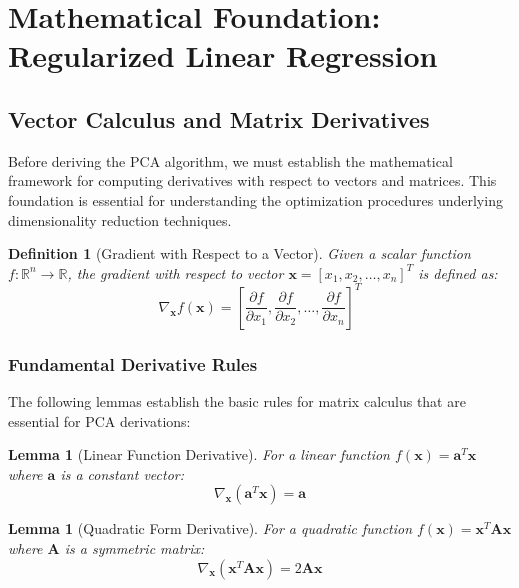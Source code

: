 \documentclass[12pt]{article}
\renewcommand{\vec}[1]{\mathbf{#1}}
\newtheorem{lemma}[theorem]{Lemma}
\newtheorem{definition}[theorem]{Definition}
\begin{document}
\newpage

\section{Mathematical Foundation: Regularized Linear Regression}


\subsection{Vector Calculus and Matrix Derivatives}

Before deriving the PCA algorithm, we must establish the mathematical framework for computing derivatives with respect to vectors and matrices. This foundation is essential for understanding the optimization procedures underlying dimensionality reduction techniques.

\begin{definition}[Gradient with Respect to a Vector]
    Given a scalar function $f: \mathbb{R}^n \rightarrow \mathbb{R}$, the gradient with respect to vector $\vec{x} = [x_1, x_2, \ldots, x_n]^T$ is defined as:
    \begin{equation}
        \nabla_{\vec{x}} f(\vec{x}) = \left[\frac{\partial f}{\partial x_1}, \frac{\partial f}{\partial x_2}, \ldots, \frac{\partial f}{\partial x_n}\right]^T
    \end{equation}
\end{definition}

\subsubsection{Fundamental Derivative Rules}

The following lemmas establish the basic rules for matrix calculus that are essential for PCA derivations:

\begin{lemma}[Linear Function Derivative]
    For a linear function $f(\vec{x}) = \vec{a}^T \vec{x}$ where $\vec{a}$ is a constant vector:
    \begin{equation}
        \nabla_{\vec{x}} (\vec{a}^T \vec{x}) = \vec{a}
    \end{equation}
\end{lemma}

\begin{lemma}[Quadratic Form Derivative] \label{lem:quadratic}
    For a quadratic function $f(\vec{x}) = \vec{x}^T \vec{A} \vec{x}$ where $\vec{A}$ is a symmetric matrix:
    \begin{equation}
        \nabla_{\vec{x}} (\vec{x}^T \vec{A} \vec{x}) = 2\vec{A}\vec{x}
    \end{equation}
\end{lemma}
\end{document}
